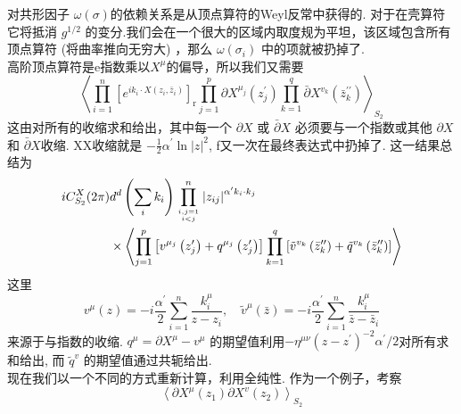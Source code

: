 对共形因子 $\omega(\sigma)$的依赖关系是从顶点算符的Weyl反常中获得的. 对于在壳算符它将抵消 $g^{1 / 2}$ 的变分.我们会在一个很大的区域内取度规为平坦，该区域包含所有顶点算符 (将曲率推向无穷大) ，那么 $\omega\left(\sigma_{i}\right)$ 中的项就被扔掉了.\\
高阶顶点算符是e指数乘以$X^{\mu}$的偏导，所以我们又需要
\begin{equation}
	\left\langle\prod_{i=1}^{n}\left[e^{i k_{i} \cdot X\left(z_{i}, \bar{z}_{i}\right)}\right]_{\mathrm{r}} \prod_{j=1}^{p} \partial X^{\mu_{j}}\left(z_{j}^{\prime}\right) \prod_{k=1}^{q} \bar{\partial} X^{v_{k}}\left(\bar{z}_{k}^{\prime \prime}\right)\right\rangle_{S_{2}}
\end{equation}
这由对所有的收缩求和给出，其中每一个 $\partial X$ 或 $\bar{\partial} X$ 必须要与一个指数或其他 $\partial X$ 和 $\bar{\partial} X$收缩. XX收缩就是 $-\frac{1}{2} \alpha^{\prime} \ln |z|^{2}$, f又一次在最终表达式中扔掉了. 这一结果总结为
\begin{equation}
	\begin{aligned}
		i C_{S_{2}}^{X}(2 \pi) & d^{d}\left(\sum_{i} k_{i}\right) \prod_{i, j=1 \atop i<j}^{n}\left|z_{i j}\right|^{\alpha^{\prime} k_{i} \cdot k_{j}} \\
		& \times\left\langle\prod_{j=1}^{p}\left[v^{\mu_{j}}\left(z_{j}^{\prime}\right)+q^{\mu_{j}}\left(z_{j}^{\prime}\right)\right] \prod_{k=1}^{q}\left[\tilde{v}^{v_{k}}\left(\bar{z}_{k}^{\prime \prime}\right)+\tilde{q}^{v_{k}}\left(\bar{z}_{k}^{\prime \prime}\right)\right]\right\rangle
	\end{aligned}
\end{equation}
这里
\begin{equation}
	v^{\mu}(z)=-i \frac{\alpha^{\prime}}{2} \sum_{i=1}^{n} \frac{k_{i}^{\mu}}{z-z_{i}}, \quad \tilde{v}^{\mu}(\bar{z})=-i \frac{\alpha^{\prime}}{2} \sum_{i=1}^{n} \frac{k_{i}^{\mu}}{\bar{z}-\bar{z}_{i}}
\end{equation}
来源于与指数的收缩.  $q^{\mu}=\partial X^{\mu}-v^{\mu}$ 的期望值利用$-\eta^{\mu \nu}\left(z-z^{\prime}\right)^{-2} \alpha^{\prime} / 2$对所有求和给出, 而 $\tilde{q}^{v}$ 的期望值通过共轭给出.\\
现在我们以一个不同的方式重新计算，利用全纯性. 作为一个例子，考察
\begin{equation}
	\left\langle\partial X^{\mu}\left(z_{1}\right) \partial X^{v}\left(z_{2}\right)\right\rangle_{S_{2}}
\end{equation}
